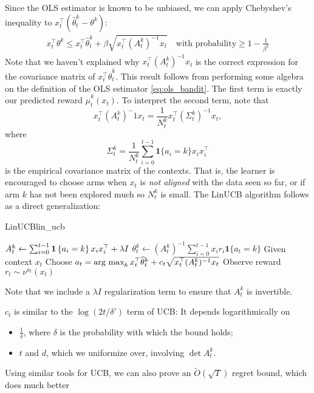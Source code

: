 \documentclass[\main/main]{subfiles}
\begin{document}
Since the OLS estimator is known to be unbiased, we can apply Chebyshev's inequality to $x_t^\top (\hat \theta_t^k - \theta^k)$:
\begin{align*}
    x_t^\top \theta^k \le x_t^\top \hat \theta_t^k + \beta \sqrt{x_t^\top (A_t^k)^{-1} x_t} \quad \text{with probability} \ge 1 - \frac{1}{\beta^2}
\end{align*}
Note that we haven't explained why $x_t^\top (A_t^k)^{-1} x_t$ is the correct expression for the covariance matrix of $x_t^\top \hat \theta_t^k$. This result follows from performing some algebra on the definition of the OLS estimator \eqref{eq:ols_bandit}.
The first term is exactly our predicted reward $\hat \mu^k_t(x_t)$.
To interpret the second term, note that \[
    x_t^\top (A_t^k)^-1 x_t = \frac{1}{N_t^k} x_t^\top (\Sigma_t^k)^{-1} x_t,
\]
where \[ \Sigma_t^k = \frac{1}{N_t^k} \sum_{i=0}^{t-1} \mathbf{1} \{a_i = k \} x_i x_i^\top \]
is the empirical covariance matrix of the contexts.
That is, the learner is encouraged to choose arms when $x_t$ is \emph{not aligned} with the data seen so far,
or if arm $k$ has not been explored much so $N_t^k$ is small.
The LinUCB algorithm follows as a direct generalization:

\begin{definition}{LinUCB}{lin_ucb}
\begin{algorithmic}
            \State $A_t^k \gets \sum_{i=0}^{t-1} \mathbf{1}\left\{a_i = k\right\} x_i x_i^\top + \lambda I$
            \State $\theta_t^k \gets (A_t^k)^{-1} \sum_{i=0}^{t-1} x_i r_i \mathbf{1} \{ a_t = k \}$
        \EndFor
        \State Given context $x_t$
        \State Choose $a_t = \operatorname*{\textrm{arg\ max}}_k x_t^\top \widehat \theta_t^k + c_t \sqrt{x_t^\top (A_t^k)^{-1} x_t}$
        \State Observe reward $r_t \sim \nu^{a_t}(x_t)$
    \EndFor
\end{algorithmic}
Note that we include a $\lambda I$ regularization term to ensure that $A_t^k$ is invertible.

$c_t$ is similar to the $\log (2t/\delta')$ term of UCB: It depends logarithmically on
\begin{itemize}
    \item $\frac{1}{\delta}$, where $\delta$ is the probability with which the bound holds;
    \item $t$ and $d$, which we uniformize over, involving $\det A_t^k$.
\end{itemize}
\end{definition}

Using similar tools for UCB, we can also prove an $\tilde{O}(\sqrt{T})$ regret bound, which does much better
\end{document}
